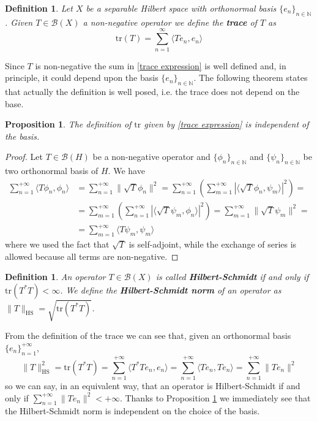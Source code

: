 \documentclass[corpo=11pt, stile=classica, tipotesi=custom,
greek, evenboxes, english]{toptesi}
\numberwithin{equation}{chapter}
\newtheorem{defi}[teo]{Definition}
\newtheorem{prop}[teo]{Proposition}
\theoremstyle{remark}
\newcommand{\N}{\mathbb{N}} %
\newcommand{\B}{\mathscr{B}} %
\begin{document}
\begin{defi}\label{trace def}
	Let $X$ be a separable Hilbert space with orthonormal basis $\{e_n\}_{n \in \N}$. Given $T \in \B(X)$ a non-negative operator we define the \textbf{trace} of $T$ as
	\begin{equation}\label{trace expression}
		\mathrm{tr}(T) = \sum_{n=1}^{\infty} \langle T e_n, e_n \rangle
	\end{equation}
\end{defi}
Since $T$ is non-negative the sum in \eqref{trace expression} is well defined and, in principle, it could depend upon the basis $\{e_n\}_{n \in \N}$. The following theorem states that actually the definition is well posed, i.e. the trace does not depend on the base.
\begin{prop}\label{trace is well-defined}
	The definition of $\mathrm{tr}$ given by \eqref{trace expression} is independent of the basis.
\end{prop}
\begin{proof}
	Let $T \in \B(H)$ be a non-negative operator and $\{\phi_n\}_{n \in \N}$ and $\{\psi_n\}_{n \in \N}$ be two orthonormal basis of $H$. We have
	\begin{align*}
		\sum_{n=1}^{+\infty} \langle T\phi_n,\phi_n \rangle &= \sum_{n=1}^{+\infty} \|\sqrt{T}\phi_n\|^2 = \sum_{n=1}^{+\infty} \left(\sum_{m=1}^{+\infty} |\langle \sqrt{T}\phi_n, \psi_m \rangle|^2 \right)=\\
															&= \sum_{m=1}^{+\infty} \left(\sum_{n=1}^{+\infty} |\langle \sqrt{T}\psi_m, \phi_n \rangle|^2 \right) = \sum_{m=1}^{+\infty} \|\sqrt{T}\psi_m\|^2 = \\
															&= \sum_{m=1}^{+\infty} \langle T \psi_m, \psi_m \rangle
	\end{align*}
	where we used the fact that $\sqrt{T}$ is self-adjoint, while the exchange of series is allowed because all terms are non-negative.
\end{proof}
\begin{defi}\label{Hilbert-Schmidt operator def}
	An operator $T \in \B(X)$ is called \textbf{Hilbert-Schmidt} if and only if $\mathrm{tr}(T^*T) < \infty$. We define the \textbf{Hilbert-Schmidt norm} of an operator as $\|T\|_{\mathrm{HS}} = \sqrt{\mathrm{tr}(T^*T)}$.
\end{defi}
From the definition of the trace we can see that, given an orthonormal basis $\{e_n\}_{n=1}^{+\infty}$,
\begin{equation}\label{Hilbert-Schmidt norm expression}
	\|T\|_{\mathrm{HS}}^2 = \mathrm{tr}(T^*T) = \sum_{n=1}^{+\infty} \langle T^*Te_n,e_n \rangle = \sum_{n=1}^{+\infty} \langle Te_n,Te_n \rangle = \sum_{n=1}^{+\infty} \|Te_n\|^2
\end{equation}
so we can say, in an equivalent way, that an operator is Hilbert-Schmidt if and only if $\sum_{n=1}^{+\infty} \|Te_n\|^2 < +\infty$. Thanks to Proposition \ref{trace is well-defined} we immediately see that the Hilbert-Schmidt norm is independent on the choice of the basis.
\end{document}
